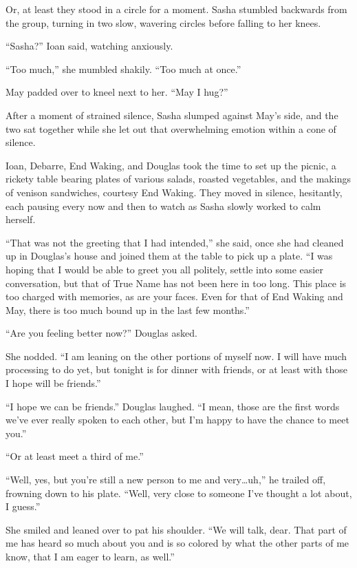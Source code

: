 Or, at least they stood in a circle for a moment. Sasha stumbled backwards from the group, turning in two slow, wavering circles before falling to her knees.

``Sasha?'' Ioan said, watching anxiously.

``Too much,'' she mumbled shakily. ``Too much at once.''

May padded over to kneel next to her. ``May I hug?''

After a moment of strained silence, Sasha slumped against May's side, and the two sat together while she let out that overwhelming emotion within a cone of silence.

Ioan, Debarre, End Waking, and Douglas took the time to set up the picnic, a rickety table bearing plates of various salads, roasted vegetables, and the makings of venison sandwiches, courtesy End Waking. They moved in silence, hesitantly, each pausing every now and then to watch as Sasha slowly worked to calm herself.

``That was not the greeting that I had intended,'' she said, once she had cleaned up in Douglas's house and joined them at the table to pick up a plate. ``I was hoping that I would be able to greet you all politely, settle into some easier conversation, but that of True Name has not been here in too long. This place is too charged with memories, as are your faces. Even for that of End Waking and May, there is too much bound up in the last few months.''

``Are you feeling better now?'' Douglas asked.

She nodded. ``I am leaning on the other portions of myself now. I will have much processing to do yet, but tonight is for dinner with friends, or at least with those I hope will be friends.''

``I hope we can be friends.'' Douglas laughed. ``I mean, those are the first words we've ever really spoken to each other, but I'm happy to have the chance to meet you.''

``Or at least meet a third of me.''

``Well, yes, but you're still a new person to me and very\ldots uh,'' he trailed off, frowning down to his plate. ``Well, very close to someone I've thought a lot about, I guess.''

She smiled and leaned over to pat his shoulder. ``We will talk, dear. That part of me has heard so much about you and is so colored by what the other parts of me know, that I am eager to learn, as well.''

